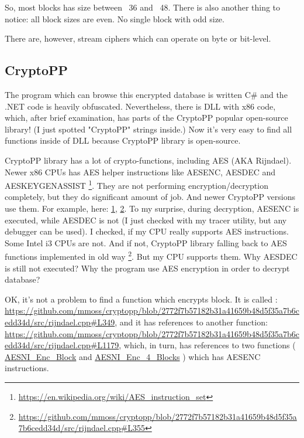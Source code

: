 So, most blocks has size between ~36 and ~48.
There is also another thing to notice: all block sizes are even.
No single block with odd size.

There are, however, stream ciphers which can operate on byte or bit-level.

\subsection{CryptoPP}

The program which can browse this encrypted database is written C\# and the .NET code
is heavily obfuscated.
Nevertheless, there is DLL with x86 code, which, after brief examination,
has parts of the CryptoPP popular open-source library!
(I just spotted "CryptoPP" strings inside.)
Now it's very easy to find all functions inside of DLL because CryptoPP library is open-source.

CryptoPP library has a lot of crypto-functions, including AES (AKA Rijndael).
Newer x86 CPUs has AES helper instructions like AESENC, AESDEC and AESKEYGENASSIST
\footnote{\url{https://en.wikipedia.org/wiki/AES_instruction_set}}.
They are not performing encryption/decryption completely, but they do significant amount of job.
And newer CryptoPP versions use them.
For example, here:
\href{https://github.com/mmoss/cryptopp/blob/2772f7b57182b31a41659b48d5f35a7b6cedd34d/src/rijndael.cpp#L1034}{1},
\href{https://github.com/mmoss/cryptopp/blob/2772f7b57182b31a41659b48d5f35a7b6cedd34d/src/rijndael.cpp#L1000}{2}.
To my surprise, during decryption, AESENC is executed, while AESDEC is not 
(I just checked with my tracer utility, but any debugger can be used).
I checked, if my CPU really supports AES instructions. Some Intel i3 CPUs are not.
And if not, CryptoPP library falling back to AES functions implemented in old way
\footnote{\url{https://github.com/mmoss/cryptopp/blob/2772f7b57182b31a41659b48d5f35a7b6cedd34d/src/rijndael.cpp#L355}}.
But my CPU supports them.
Why AESDEC is still not executed?
Why the program use AES encryption in order to decrypt database?

OK, it's not a problem to find a function which encrypts block.
It is called :\\
\url{https://github.com/mmoss/cryptopp/blob/2772f7b57182b31a41659b48d5f35a7b6cedd34d/src/rijndael.cpp#L349},
and it has references to another function: \\
\url{https://github.com/mmoss/cryptopp/blob/2772f7b57182b31a41659b48d5f35a7b6cedd34d/src/rijndael.cpp#L1179},
which, in turn, has references to two functions (
\href{https://github.com/mmoss/cryptopp/blob/2772f7b57182b31a41659b48d5f35a7b6cedd34d/src/rijndael.cpp#L1000}{AESNI\_Enc\_Block}
and 
\href{https://github.com/mmoss/cryptopp/blob/2772f7b57182b31a41659b48d5f35a7b6cedd34d/src/rijndael.cpp#L1012}{AESNI\_Enc\_4\_Blocks}
)
which has AESENC instructions.

